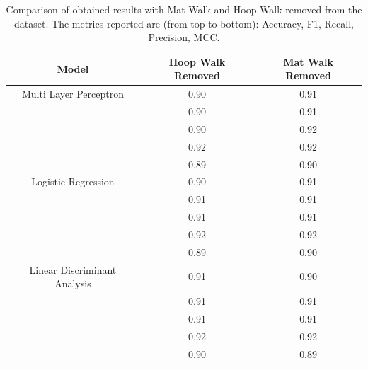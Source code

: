             \begin{table}[htbp]
                \centering
                \begin{tabular}{|c|c|c|}
                \hline
                \textbf{Model} & \textbf{Hoop Walk Removed} & \textbf{Mat Walk Removed} \\ \hline
                    Multi Layer Perceptron          & 0.90 & 0.91 \\ 
                                                    & 0.90 & 0.91 \\ 
                                                    & 0.90 & 0.92 \\
                                                    & 0.92 & 0.92 \\ 
                                                    & 0.89 & 0.90 \\
                                                    \hline
                    Logistic Regression             & 0.90 & 0.91 \\ 
                                                    & 0.91 & 0.91 \\ 
                                                    & 0.91 & 0.91 \\ 
                                                    & 0.92 & 0.92 \\
                                                    & 0.89 & 0.90 \\
                                                    \hline
                    Linear Discriminant Analysis    & 0.91 & 0.90 \\ 
                                                    & 0.91 & 0.91 \\ 
                                                    & 0.91 & 0.91 \\ 
                                                    & 0.92 & 0.92 \\
                                                    & 0.90 & 0.89 \\ 
                                                    \hline
                \end{tabular}
                \caption{Comparison of obtained results with Mat-Walk and Hoop-Walk removed from the dataset. The metrics reported are (from top to bottom): Accuracy, F1, Recall, Precision, MCC.}
                \label{tab:feature_engineering_approach_mat_hoop}
            \end{table}

